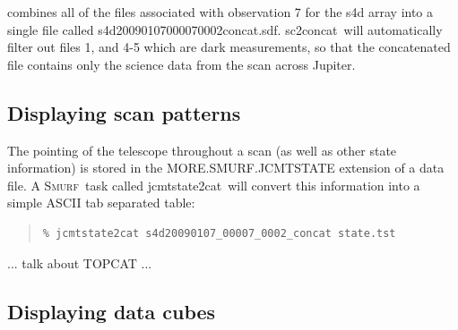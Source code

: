 \documentclass[twoside,11pt]{article}
\newenvironment{myquote}{\begin{quote}\begin{small}}{\end{small}\end{quote}}
\newcommand{\smurf}{\xref{\textsc{Smurf}}{sun258}{}}
\newcommand{\task}[1]{\textsf{#1}}
\newcommand{\concat}{\xref{\task{sc2concat}}{sun258}{SC2CONCAT}}
\newcommand{\jcmtstate}{\xref{\task{jcmtstate2cat}}{sun258}{JCMTSTATE2CAT}}
\newcommand{\xref}[3]{#1}
\newcommand{\xlabel}[1]{}
\renewcommand{\_}{\texttt{\symbol{95}}}
\begin{document}
combines all of the files associated with observation 7 for the s4d
array into a single file called
s4d20090107\_00007\_0002\_concat.sdf. \concat\ will automatically
filter out files 1, and 4-5 which are dark measurements, so that the
concatenated file contains only the science data from the scan across
Jupiter. 

\subsection{\xlabel{display_scan}Displaying scan patterns}

The pointing of the telescope throughout a scan (as well as other
state information) is stored in the MORE.SMURF.JCMTSTATE extension of
a data file. A \smurf\ task called \jcmtstate\ will convert this
information into a simple ASCII tab separated table:

\begin{myquote}
\begin{verbatim}
% jcmtstate2cat s4d20090107_00007_0002_concat state.tst
\end{verbatim}
\end{myquote}

... talk about TOPCAT ...

\subsection{\xlabel{display_cube}Displaying data cubes} 
\end{document}
